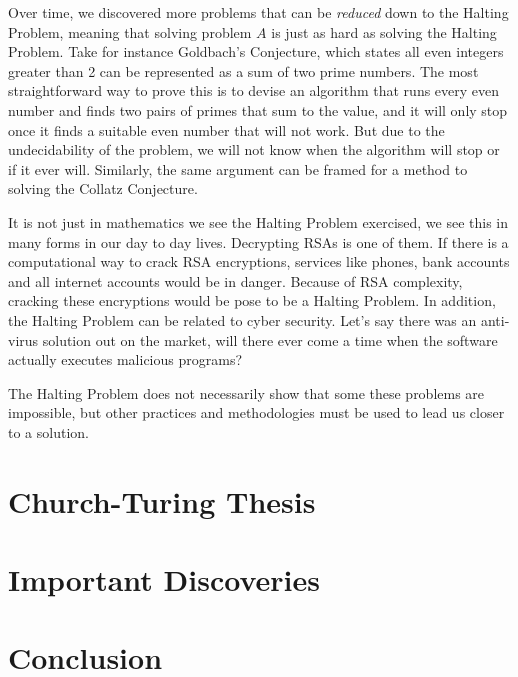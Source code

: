 \documentclass[12pt]{article}
\begin{document}
Over time, we discovered more problems that can be \textit{reduced} down to the Halting Problem, meaning that solving problem $A$ is just as hard as solving the Halting Problem. Take for instance Goldbach's Conjecture, which states all even integers greater than 2 can be represented as a sum of two prime numbers. The most straightforward way to prove this is to devise an algorithm that runs every even number and finds two pairs of primes that sum to the value, and it will only stop once it finds a suitable even number that will not work. But due to the undecidability of the problem, we will not know when the algorithm will stop or if it ever will. Similarly, the same argument can be framed for a method to solving the Collatz Conjecture. 

It is not just in mathematics we see the Halting Problem exercised, we see this in many forms in our day to day lives. Decrypting RSAs is one of them. If there is a computational way to crack RSA encryptions, services like phones, bank accounts and all internet accounts would be in danger. Because of RSA complexity, cracking these encryptions would be pose to be a Halting Problem. In addition, the Halting Problem can be related to cyber security. Let's say there was an anti-virus solution out on the market, will there ever come a time when the software actually executes malicious programs?

The Halting Problem does not necessarily show that some these problems are impossible, but other practices and methodologies must be used to lead us closer to a solution.

\section{Church-Turing Thesis}


\section{Important Discoveries}


\section{Conclusion}
\end{document}
